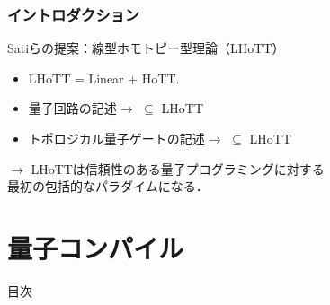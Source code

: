 \documentclass{beamer} %
\renewcommand{\subset}{\subseteq}
\newcommand{\0}{\mathbf{0}}
\newcommand{\1}{\mathbf{1}}
\newcommand{\2}{\mathbf{2}}
\begin{document}
\begin{frame}
  \frametitle{イントロダクション}
  \begin{block}{Satiらの提案：線型ホモトピー型理論（LHoTT）}
    \begin{itemize}
      \item LHoTT = Linear + HoTT.
      \item 量子回路の記述\(\to\) \(\subset\) LHoTT
      \item トポロジカル量子ゲートの記述\(\to\)
             \(\subset\) LHoTT
    \end{itemize}
    \begin{center}
      \(\longrightarrow\)
      LHoTTは信頼性のある量子プログラミングに対する\\
      最初の包括的なパラダイムになる．
    \end{center}
  \end{block}
\end{frame}


\section{量子コンパイル}
\begin{frame}[noframenumbering]{目次}
  \tableofcontents[currentsection]
\end{frame}
\end{document}
